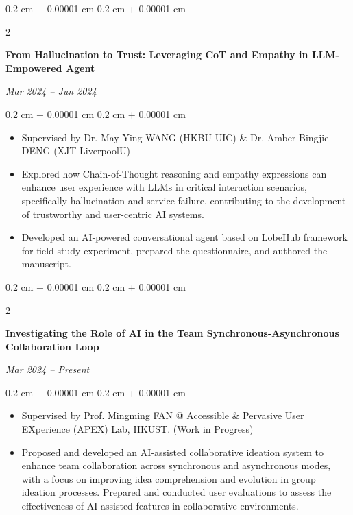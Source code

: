 \documentclass[10pt, letterpaper]{article}
\newenvironment{highlights}{
    \begin{itemize}[
        topsep=0.10 cm,
        parsep=0.10 cm,
        partopsep=0pt,
        itemsep=0pt,
        leftmargin=0.4 cm + 10pt
    ]
}{
    \end{itemize}
} %
\newenvironment{onecolentry}{
    \begin{adjustwidth}{
        0.2 cm + 0.00001 cm
    }{
        0.2 cm + 0.00001 cm
    }
}{
    \end{adjustwidth}
} %
\newenvironment{twocolentry}[2][]{
    \onecolentry
    \def\secondColumn{#2}
    \setcolumnwidth{\fill, 4.5 cm}
    \begin{paracol}{2}
}{
    \switchcolumn \raggedleft \secondColumn
    \end{paracol}
    \endonecolentry
} %
\begin{document}
        \vspace{0.2 cm}

        \begin{twocolentry}{
        \textit{Mar 2024 – Jun 2024}}
            \textbf{From Hallucination to Trust: Leveraging CoT and Empathy in LLM-Empowered Agent}
        \end{twocolentry}

        \vspace{0.10 cm}
        \begin{onecolentry}
            \begin{highlights}
                \item Supervised by Dr. May Ying WANG (HKBU-UIC) \& Dr. Amber Bingjie DENG (XJT-LiverpoolU)
                \item Explored how Chain-of-Thought reasoning and empathy expressions can enhance user experience with LLMs in critical interaction scenarios, specifically hallucination and service failure, contributing to the development of trustworthy and user-centric AI systems.
                \item Developed an AI-powered conversational agent based on LobeHub framework for field study experiment, prepared the questionnaire, and authored the manuscript.
            \end{highlights}
        \end{onecolentry}

        \vspace{0.2 cm}

        \begin{twocolentry}{
        \textit{Mar 2024 – Present}}
            \textbf{Investigating the Role of AI in the Team Synchronous-Asynchronous Collaboration Loop}
        \end{twocolentry}

        \vspace{0.10 cm}
        \begin{onecolentry}
            \begin{highlights}
                \item Supervised by Prof. Mingming FAN @ Accessible \& Pervasive User EXperience (APEX) Lab, HKUST. (Work in Progress)
                \item Proposed and developed an AI-assisted collaborative ideation system to enhance team collaboration across synchronous and asynchronous modes, with a focus on improving idea comprehension and evolution in group ideation processes. Prepared and conducted user evaluations to assess the effectiveness of AI-assisted features in collaborative environments.
            \end{highlights}
        \end{onecolentry}
\end{document}
